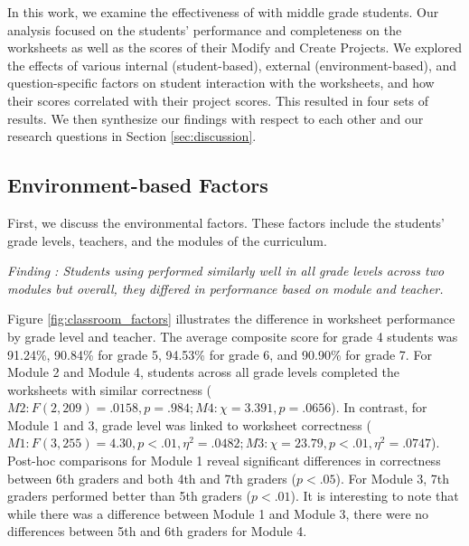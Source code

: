 
In this work, we examine the effectiveness of \ts with middle grade students. Our analysis focused on the students' performance and completeness on the worksheets as well as the scores of their Modify and Create Projects. We explored the effects of various internal (student-based), external (environment-based), and question-specific factors on student interaction with the worksheets, and how their \ts{} scores correlated with their project scores. This resulted in four sets of results. We then synthesize our findings with respect to each other and our research questions in Section \ref{sec:discussion}.


\subsection{Environment-based Factors}

First, we discuss the environmental factors. These factors include the students' grade levels, teachers, and the modules of the curriculum.

\textit{Finding : Students using \ts{} performed similarly well in all grade levels across two \scratchencore{} modules but overall, they differed in performance based on module and teacher.} 

Figure \ref{fig:classroom_factors} illustrates the difference in \ts{} worksheet performance by grade level and teacher. The average \ts{} composite score for grade 4 students was 91.24\%, 90.84\% for grade 5, 94.53\% for grade 6, and 90.90\% for grade 7. For Module 2 and Module 4, students across all grade levels completed the worksheets with similar correctness ($M2: F(2,209)=.0158, p=.984; M4:\chi=3.391, p=.0656$). In contrast, for Module 1 and 3, grade level was linked to worksheet correctness ($M1: F(3, 255)=4.30, p<.01, \eta^2=.0482; M3:\chi=23.79, p<.01, \eta^2=.0747$). Post-hoc comparisons for Module 1 reveal significant differences in correctness between 6th graders and both 4th and 7th graders ($p<.05$). For Module 3, 7th graders performed better than 5th graders ($p<.01$). It is interesting to note that while there was a difference between Module 1 and Module 3, there were no differences between 5th and 6th graders for Module 4.

